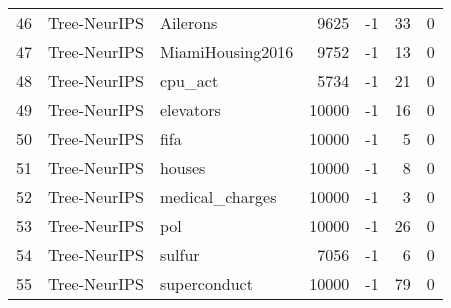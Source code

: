\begin{table}[]
{\begin{tabular}{rllrrrr}
46                     & Tree-NeurIPS & Ailerons                                         & 9625                    & -1                      & 33                      & 0                       \\
47                     & Tree-NeurIPS & MiamiHousing2016                                 & 9752                    & -1                      & 13                      & 0                       \\
48                     & Tree-NeurIPS & cpu\_act                                         & 5734                    & -1                      & 21                      & 0                       \\
49                     & Tree-NeurIPS & elevators                                        & 10000                   & -1                      & 16                      & 0                       \\
50                     & Tree-NeurIPS & fifa                                             & 10000                   & -1                      & 5                       & 0                       \\
51                     & Tree-NeurIPS & houses                                           & 10000                   & -1                      & 8                       & 0                       \\
52                     & Tree-NeurIPS & medical\_charges                                 & 10000                   & -1                      & 3                       & 0                       \\
53                     & Tree-NeurIPS & pol                                              & 10000                   & -1                      & 26                      & 0                       \\
54                     & Tree-NeurIPS & sulfur                                           & 7056                    & -1                      & 6                       & 0                       \\
55                     & Tree-NeurIPS & superconduct                                     & 10000                   & -1                      & 79                      & 0                   \\ \bottomrule
\end{tabular}
}
\end{table}
